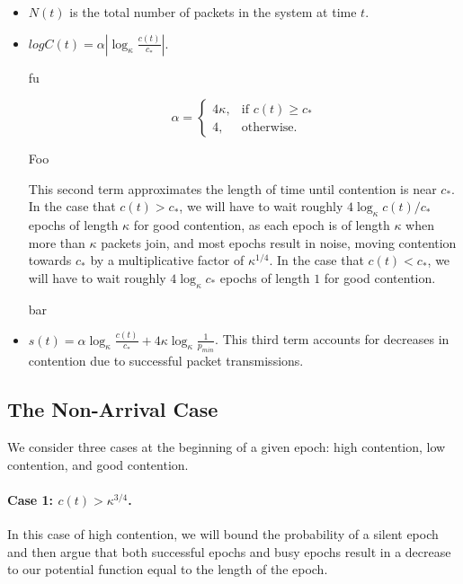\begin{itemize}
    \item $N(t)$ is the total number of packets in the system at time $t$.
    
    \item $logC(t) = \alpha | \log_\kappa \frac{c(t)}{c_*} |$.
    
    fu
    
    \[
    \alpha = \begin{cases} 
    4\kappa, & \text{if } c(t) \geq c_* \\
    4, & \text{otherwise}.
    \end{cases}
    \]
    
    Foo
    
    This second term approximates the length of time until contention is near $c_*$. In the case that $c(t) > c_*$, we will have to wait roughly $4 \log_\kappa c(t) / c_*$ epochs of length $\kappa$ for good contention, as each epoch is of length $\kappa$ when more than $\kappa$ packets join, and most epochs result in noise, moving contention towards $c_*$ by a multiplicative factor of $\kappa^{1/4}$. In the case that $c(t) < c_*$, we will have to wait roughly $4 \log_\kappa c_*$ epochs of length $1$ for good contention.
    
    bar
    
    \item $s(t) = \alpha \log_\kappa \frac{c(t)}{c_*} + 4\kappa \log_\kappa \frac{1}{p_{min}}$. This third term accounts for decreases in contention due to successful packet transmissions.
\end{itemize}

\subsection{The Non-Arrival Case}

We consider three cases at the beginning of a given epoch: high contention, low contention, and good contention.


\paragraph{Case 1: \boldmath$c(t) > \kappa^{3/4}$.}

In this case of high contention, we will bound the probability of a silent epoch and then argue that both successful epochs and busy epochs result in a decrease to our potential function equal to the length of the epoch.

